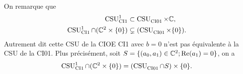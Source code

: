     On remarque que
    \begin{align}
      \CSU[1]{CI1} &\subset \CSU{CI01}\times\CC,
      \\
      \CSU[1]{CI1}\cap(\CC^2 \times \lbrace0\rbrace) &\subsetneq (\CSU{CI01}\times\lbrace0\rbrace).
    \end{align}
     Autrement dit cette CSU de la CIOE CI1 avec \(b=0\) n'est pas équivalente à la CSU de la CI01. 
    Plus précisément, soit \(S = \lbrace (a_0,a_1) \in \CC^2; \Re(a_1)=0 \rbrace\), on a
    \begin{equation}
      \CSU[1]{CI1}\cap(\CC^2 \times \lbrace0\rbrace) = (\CSU{CI01}\cap S) \times\lbrace0\rbrace. 
    \end{equation}


